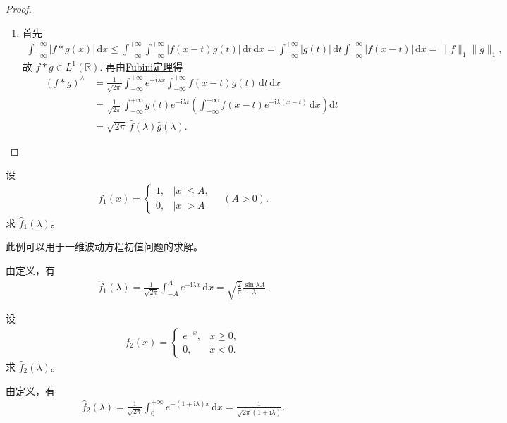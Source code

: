 \documentclass[../../main.tex]{subfiles}%
\begin{document}
\begin{proof}
\begin{enumerate}[(1)]
\item 首先
\begin{align*}
\int_{-\infty}^{+\infty}|f*g(x)|\,\mathrm{d}x
\leqslant \int_{-\infty}^{+\infty}\int_{-\infty}^{+\infty}|f(x-t)g(t)|\,\mathrm{d}t\,\mathrm{d}x 
=\int_{-\infty}^{+\infty}|g(t)|\,\mathrm{d}t\int_{-\infty}^{+\infty}|f(x-t)|\,\mathrm{d}x
=\|f\|_1\|g\|_1,
\end{align*}
故 $f*g\in L^1(\mathbb{R})$. 再由\hyperref[Real Analysis-theorem:实变函数-Fubini定理]{Fubini定理}得
\begin{align*}
(f*g)^\wedge
&=\frac{1}{\sqrt{2\pi}}\int_{-\infty}^{+\infty}e^{-\mathrm{i}\lambda x}\int_{-\infty}^{+\infty}f(x-t)g(t)\,\mathrm{d}t\,\mathrm{d}x \\
&=\frac{1}{\sqrt{2\pi}}\int_{-\infty}^{+\infty}g(t)e^{-\mathrm{i}\lambda t}
\left(\int_{-\infty}^{+\infty}f(x-t)e^{-\mathrm{i}\lambda (x-t)}\,\mathrm{d}x\right)\mathrm{d}t \\
&=\sqrt{2\pi}\,\hat{f}(\lambda)\hat{g}(\lambda).
\end{align*}
\end{enumerate}
\end{proof}

\begin{example}
设
\begin{align*}
f_1(x)=\begin{cases}
1, & |x|\leqslant A,\\
0, & |x|>A
\end{cases}\quad (A>0).
\end{align*}
求 $\hat{f}_1(\lambda)$。
\end{example}
\begin{remark}
此例可以用于一维波动方程初值问题的求解。
\end{remark}
\begin{solution}
由定义，有
\begin{align*}
\hat{f}_1(\lambda)=\frac{1}{\sqrt{2\pi}}\int_{-A}^{A}e^{-\mathrm{i}\lambda  x}\,\mathrm{d}x=\sqrt{\frac{2}{\pi}}\frac{\sin\lambda A}{\lambda}.
\end{align*}
\end{solution}

\begin{example}
设
\begin{align*}
f_2(x)=\begin{cases}
e^{-x}, & x\geqslant 0,\\
0, & x<0.
\end{cases}
\end{align*}
求 $\hat{f}_2(\lambda)$。
\end{example}
\begin{solution}
由定义，有
\begin{align*}
\hat{f}_2(\lambda)=\frac{1}{\sqrt{2\pi}}\int_0^{+\infty}e^{-(1+\mathrm{i}\lambda )x}\,\mathrm{d}x=\frac{1}{\sqrt{2\pi}(1+\mathrm{i}\lambda )}.
\end{align*}
\end{solution}
\end{document}
